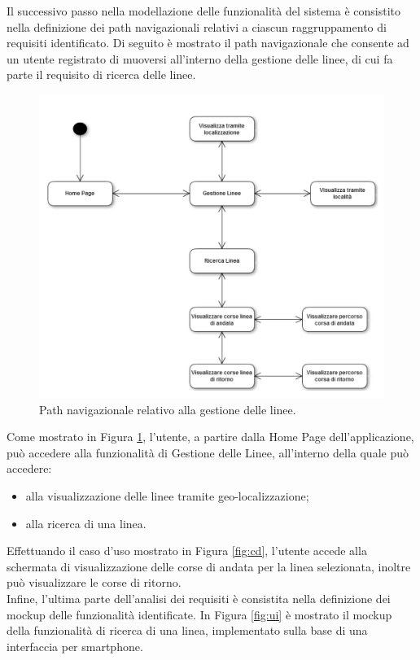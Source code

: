 Il successivo passo nella modellazione delle funzionalit\`{a} del sistema \`{e} consistito nella definizione dei path navigazionali relativi a ciascun raggruppamento di requisiti identificato. Di seguito \`{e} mostrato il path navigazionale che consente ad un utente registrato di muoversi all\rq interno della gestione delle linee, di cui fa parte il requisito di ricerca delle linee.

\begin{figure}[!h]
\centering
\includegraphics[scale=.4]{img/np.png}
\caption{Path navigazionale relativo alla gestione delle linee.}
\label{fig:np}
\end{figure} 

Come mostrato in Figura \ref{fig:np}, l'utente, a partire dalla Home Page dell'applicazione, pu\`{o} accedere alla funzionalit\`{a} di Gestione delle Linee, all\rq interno della quale pu\`{o} accedere:
\begin{itemize}
\item alla visualizzazione delle linee tramite geo-localizzazione;
\item alla ricerca di una linea.
\end{itemize}
Effettuando il caso d\rq uso mostrato in Figura \ref{fig:cd}, l\rq utente accede alla schermata di visualizzazione delle corse di andata per la linea selezionata, inoltre pu\`{o} visualizzare le corse di ritorno.\\

Infine, l'ultima parte dell\rq analisi dei requisiti \`{e} consistita nella definizione dei mockup delle funzionalit\`{a} identificate. In Figura \ref{fig:ui} \`{e} mostrato il mockup della funzionalit\`{a} di ricerca di una linea, implementato sulla base di una interfaccia per smartphone. 

